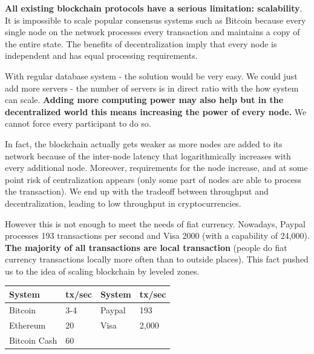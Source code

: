\documentclass[portrait,ansidpaper,fontscale=0.445]{baposter} %
\begin{document}
\begin{poster}
{    \textbf{All existing blockchain protocols have a serious limitation: scalability}. It is
impossible to scale popular consensus systems such as Bitcoin because every
single node on the network processes every transaction and maintains a copy of
the entire state. The benefits of decentralization imply that every node is
independent and has equal processing requirements.

\vspace{0.5em}
With regular database system - the solution would be very
easy. We could just add more servers - the number of servers is in direct ratio
with the how system can scale. \textbf{Adding more computing power may also help but in
the decentralized world this means increasing the power of every node.}  We
cannot force every participant to do so.

\vspace{0.5em}
In fact, the blockchain actually gets weaker as more nodes are added to its
network because of the inter-node latency that logarithmically increases with
every additional node. Moreover, requirements for the node increase, and at
some point risk of centralization appears (only some part of nodes are able to
process the transaction). We end up with the tradeoff between throughput and
decentralization, leading to low throughput in cryptocurrencies.

\vspace{0.5em}
However this is not enough to meet the needs of fiat currency.  Nowadays,
Paypal processes 193 transactions per second and Visa 2000 (with a
capability of 24,000). \textbf{The majority of all transactions are local transaction}
(people do fiat currency transactions locally more often than to outside
places). This fact pushed us to the idea of scaling blockchain by leveled
zones.

\vspace{-0.5em}
\begin{center}
\begin{tabular}{l l | l l}
\textbf{System} & \textbf{tx/sec} & \textbf{System} & \textbf{tx/sec} \\
\midrule
Bitcoin & 3-4 &        Paypal &  193 \\
Ethereum & 20 &        Visa & 2,000 \\
Bitcoin Cash & 60 &          &       \\


\end{tabular}
\end{center}

}
\end{poster}
\end{document}
